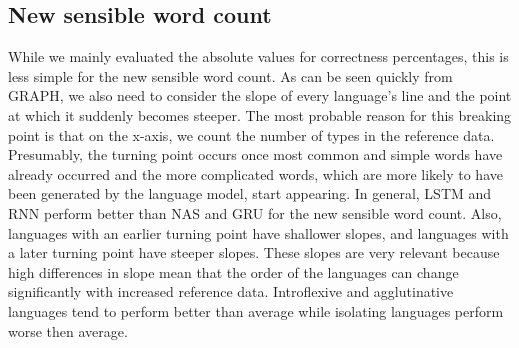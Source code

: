 \documentclass[11pt,a4paper,twoside,openright]{scrbook}
\begin{document}
\subsection{New sensible word count}
While we mainly evaluated the absolute values for correctness percentages, this is less simple for the new sensible word count. As can be seen quickly from GRAPH, we also need to consider the slope of every language’s line and the point at which it suddenly becomes steeper. The most probable reason for this breaking point is that on the x-axis, we count the number of types in the reference data. Presumably, the turning point occurs once most common and simple words have already occurred and the more complicated words, which are more likely to have been generated by the language model, start appearing. 
In general, LSTM and RNN perform better than NAS and GRU for the new sensible word count. Also, languages with an earlier turning point have shallower slopes, and languages with a later turning point have steeper slopes. These slopes are very relevant because high differences in slope mean that the order of the languages can change significantly with increased reference data.  Introflexive and agglutinative languages tend to perform better than average while isolating languages perform worse then average.
\end{document}
